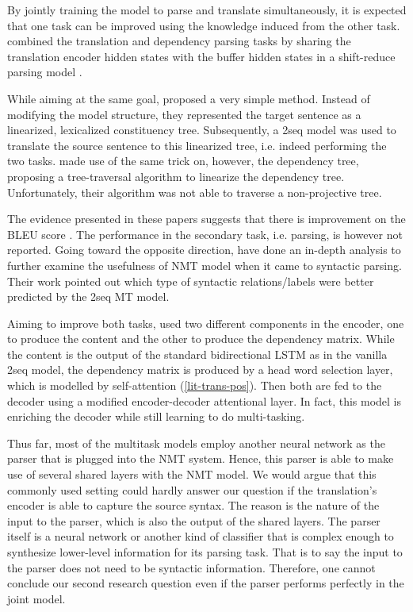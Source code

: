 By jointly training the model to parse and translate simultaneously, it is expected that one task can be improved using the knowledge induced from the other task.
\citet{DBLP:conf/acl/EriguchiTC17} combined the translation and dependency parsing tasks by sharing the translation encoder hidden states with the buffer hidden states in a shift-reduce parsing model \cite{DBLP:conf/naacl/DyerKBS16}.

While aiming at the same goal, \citet{DBLP:conf/acl/AharoniG17a} proposed a very simple method.
Instead of modifying the model structure, they represented the target sentence as a linearized, lexicalized constituency tree.
Subsequently, a \seq2seq model was used to translate the source sentence to this linearized tree, i.e. indeed performing the two tasks.
\citet{DBLP:conf/ijcnlp/LeMYM17} made use of the same trick on, however, the dependency tree, proposing a tree-traversal algorithm to linearize the dependency tree.
Unfortunately, their algorithm was not able to traverse a non-projective tree.

The evidence presented in these papers suggests that there is improvement on the BLEU score \citep{BLEU}.
The performance in the secondary task, i.e. parsing, is however not reported.
Going toward the opposite direction, \citet{DBLP:conf/emnlp/ShiPK16} have done an in-depth analysis to further examine the usefulness of NMT model when it came to syntactic parsing. Their work pointed out which type of syntactic relations/labels were better predicted by the \seq2seq MT model.

Aiming to improve both tasks, \cite{tran2018inducing} used two different components in the encoder, one to produce the content and the other to produce the dependency matrix.
While the content is the output of the standard bidirectional LSTM as in the vanilla \seq2seq model, the dependency matrix is produced by a head word selection layer, which is modelled by self-attention (\cref{lit-trans-pos}).
Then both are fed to the decoder using a modified encoder-decoder attentional layer.
In fact, this model is enriching the decoder while still learning to do multi-tasking.

Thus far, most of the multitask models employ another neural network as the parser that is plugged into the NMT system.
Hence, this parser is able to make use of several shared layers with the NMT model.
We would argue that this commonly used setting could hardly answer our question if the translation's encoder is able to capture the source syntax.
The reason is the nature of the input to the parser, which is also the output of the shared layers.
The parser itself is a neural network or another kind of classifier that is complex enough to synthesize lower-level information for its parsing task.
That is to say the input to the parser does not need to be syntactic information.
Therefore, one cannot conclude our second research question even if the parser performs perfectly in the joint model.

